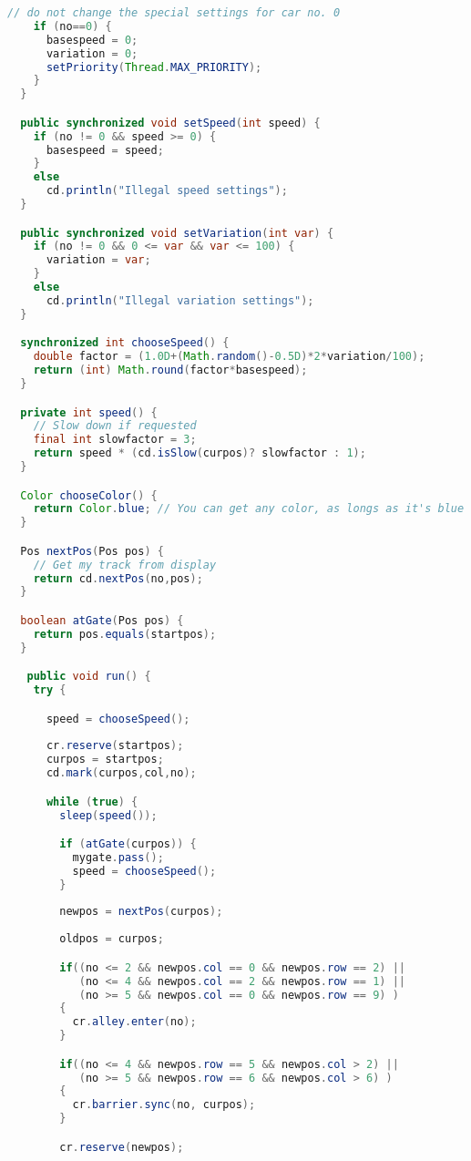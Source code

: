 \begin{lstlisting}[language=java]
    // do not change the special settings for car no. 0
    if (no==0) {
      basespeed = 0;  
      variation = 0; 
      setPriority(Thread.MAX_PRIORITY); 
    }
  }

  public synchronized void setSpeed(int speed) { 
    if (no != 0 && speed >= 0) {
      basespeed = speed;
    }
    else
      cd.println("Illegal speed settings");
  }

  public synchronized void setVariation(int var) { 
    if (no != 0 && 0 <= var && var <= 100) {
      variation = var;
    }
    else
      cd.println("Illegal variation settings");
  }

  synchronized int chooseSpeed() { 
    double factor = (1.0D+(Math.random()-0.5D)*2*variation/100);
    return (int) Math.round(factor*basespeed);
  }

  private int speed() {
    // Slow down if requested
    final int slowfactor = 3;  
    return speed * (cd.isSlow(curpos)? slowfactor : 1);
  }

  Color chooseColor() { 
    return Color.blue; // You can get any color, as longs as it's blue 
  }

  Pos nextPos(Pos pos) {
    // Get my track from display
    return cd.nextPos(no,pos);
  }

  boolean atGate(Pos pos) {
    return pos.equals(startpos);
  }

   public void run() {
    try {

      speed = chooseSpeed();
      
      cr.reserve(startpos);
      curpos = startpos;
      cd.mark(curpos,col,no);

      while (true) { 
        sleep(speed());

        if (atGate(curpos)) { 
          mygate.pass(); 
          speed = chooseSpeed();
        }
        	
        newpos = nextPos(curpos);
        
        oldpos = curpos;

        if((no <= 2 && newpos.col == 0 && newpos.row == 2) ||
           (no <= 4 && newpos.col == 2 && newpos.row == 1) ||
           (no >= 5 && newpos.col == 0 && newpos.row == 9) )
        {
          cr.alley.enter(no);
        }

        if((no <= 4 && newpos.row == 5 && newpos.col > 2) ||
           (no >= 5 && newpos.row == 6 && newpos.col > 6) )
        {
          cr.barrier.sync(no, curpos);
        }

        cr.reserve(newpos);


\end{lstlisting}
